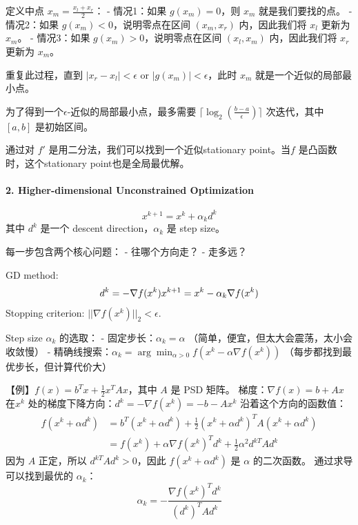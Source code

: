 \documentclass[11pt,a4paper]{article}
\begin{document}
定义中点 \(x_m = \frac{x_l + x_r}{2}\)： - 情况1：如果 \(g(x_m) = 0\)，则 \(x_m\) 就是我们要找的点。 - 情况2：如果 \(g(x_m) < 0\)，说明零点在区间 \((x_m, x_r)\) 内，因此我们将 \(x_l\) 更新为 \(x_m\)。 - 情况3：如果 \(g(x_m) > 0\)，说明零点在区间 \((x_l, x_m)\) 内，因此我们将 \(x_r\) 更新为 \(x_m\)。

重复此过程，直到 \(|x_r - x_l| < \epsilon\) or \(|g(x_m)| < \epsilon\)，此时 \(x_m\) 就是一个近似的局部最小点。

为了得到一个\(\epsilon\)-近似的局部最小点，最多需要 \(\lceil \log_2\left(\frac{b - a}{\epsilon}\right) \rceil\) 次迭代，其中 \([a, b]\) 是初始区间。

通过对 \(f'\) 是用二分法，我们可以找到一个近似stationary point。当\(f\) 是凸函数时，这个stationary point也是全局最优解。

\paragraph{2. Higher-dimensional Unconstrained Optimization}\label{higher-dimensional-unconstrained-optimization}

\[x^{k+1} = x^k + \alpha_k d^k\] 其中 \(d^k\) 是一个 descent direction，\(\alpha_k\) 是 step size。

每一步包含两个核心问题： - 往哪个方向走？ - 走多远？

GD method: \[d^k = -\nabla f(x^k)\\
x^{k+1} = x^k - \alpha_k \nabla f(x^k)\] Stopping criterion: \(||\nabla f(x^k)||_2 < \epsilon\).

Step size \(\alpha_k\) 的选取： - 固定步长：\(\alpha_k = \alpha\) （简单，便宜，但太大会震荡，太小会收敛慢） - 精确线搜索：\(\alpha_k = \arg\min_{\alpha > 0} f(x^k - \alpha \nabla f(x^k))\) （每步都找到最优步长，但计算代价大）

【例】\(f(x) = b^T x + \frac{1}{2} x^T A x\)，其中 \(A\) 是 PSD 矩阵。 梯度：\(\nabla f(x) = b + A x\) 在\(x^k\) 处的梯度下降方向：\(d^k = -\nabla f(x^k) = -b - A x^k\) 沿着这个方向的函数值： \[\begin{aligned}
f(x^k + \alpha d^k) &= b^T (x^k + \alpha d^k) + \frac{1}{2} (x^k + \alpha d^k)^T A (x^k + \alpha d^k) \\
&= f(x^k) + \alpha \nabla f(x^k)^T d^k + \frac{1}{2} \alpha^2 d^{kT} A d^k
\end{aligned}\] 因为 \(A\) 正定，所以 \(d^{kT} A d^k > 0\)，因此 \(f(x^k + \alpha d^k)\) 是 \(\alpha\) 的二次函数。 通过求导可以找到最优的 \(\alpha_k\)： \[\alpha_k = -\frac{\nabla f(x^k)^T d^k}{(d^{k})^T A d^k}\]
\end{document}
